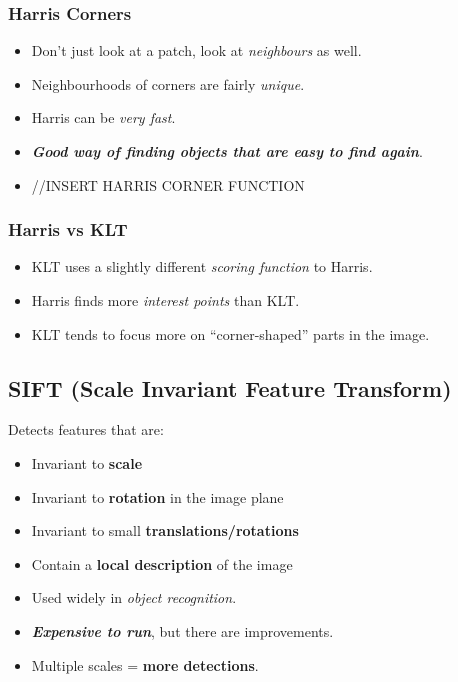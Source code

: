 \documentclass[english, 10pt]{article}
\begin{document}
\subsubsection{Harris Corners}\label{harris-corners}

\begin{itemize}
\itemsep1pt\parskip0pt
\item
  Don't just look at a patch, look at \emph{neighbours} as well.
\item
  Neighbourhoods of corners are fairly \emph{unique}.
\item
  Harris can be \emph{very fast}.
\item
  \textbf{\emph{Good way of finding objects that are easy to find
  again}}.
\item
  //INSERT HARRIS CORNER FUNCTION
\end{itemize}

\subsubsection{Harris vs KLT}\label{harris-vs-klt}

\begin{itemize}
\itemsep1pt\parskip0pt
\item
  KLT uses a slightly different \emph{scoring function} to Harris.
\item
  Harris finds more \emph{interest points} than KLT.
\item
  KLT tends to focus more on ``corner-shaped'' parts in the image.
\end{itemize}

\subsection{SIFT (Scale Invariant Feature
Transform)}\label{sift-scale-invariant-feature-transform}

Detects features that are:

\begin{itemize}
\item
  Invariant to \textbf{scale}
\item
  Invariant to \textbf{rotation} in the image plane
\item
  Invariant to small \textbf{translations/rotations}
\item
  Contain a \textbf{local description} of the image
\item
  Used widely in \emph{object recognition}.
\item
  \textbf{\emph{Expensive to run}}, but there are improvements.
\item
  Multiple scales = \textbf{more detections}.
\end{itemize}
\end{document}
